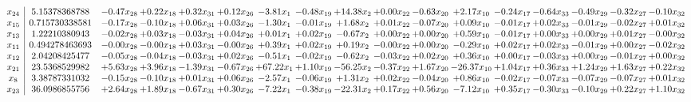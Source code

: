 \documentclass[9pt]{article}
\begin{document}
 \[\begin{array}{c| c c@{\hskip 2pt} c@{\hskip 2pt} c@{\hskip 2pt} c@{\hskip 2pt} c@{\hskip 2pt} c@{\hskip 2pt} c@{\hskip 2pt} c@{\hskip 2pt} c@{\hskip 2pt} c@{\hskip 2pt} c@{\hskip 2pt} c@{\hskip 2pt} c@{\hskip 2pt} c@{\hskip 2pt} c@{\hskip 2pt} }
 x_{24}   &  5.15378368788 & -0.47 x_{28} & +  0.22 x_{18} & +  0.32 x_{31} & +  0.12 x_{26} & -3.81 x_{1} & -0.48 x_{19} & + 14.38 x_{2} & +  0.00 x_{22} & -0.63 x_{20} & +  2.17 x_{10} & -0.24 x_{17} & -0.64 x_{33} & -0.49 x_{29} & -0.32 x_{27} & -0.10 x_{32}\\
 x_{15}   &  0.715730338581 & -0.17 x_{28} & -0.10 x_{18} & +  0.06 x_{31} & +  0.03 x_{26} & -1.30 x_{1} & -0.01 x_{19} & +  1.68 x_{2} & +  0.01 x_{22} & -0.07 x_{20} & +  0.09 x_{10} & -0.01 x_{17} & +  0.02 x_{33} & -0.01 x_{29} & -0.02 x_{27} & +  0.01 x_{32}\\
 x_{13}   &  1.22210380943 & -0.02 x_{28} & +  0.03 x_{18} & -0.03 x_{31} & +  0.04 x_{26} & +  0.01 x_{1} & +  0.02 x_{19} & -0.67 x_{2} & +  0.00 x_{22} & +  0.00 x_{20} & +  0.59 x_{10} & -0.01 x_{17} & +  0.00 x_{33} & +  0.00 x_{29} & +  0.01 x_{27} & -0.00 x_{32}\\
 x_{11}   &  0.494278463693 & -0.00 x_{28} & -0.00 x_{18} & +  0.03 x_{31} & -0.00 x_{26} & +  0.39 x_{1} & +  0.02 x_{19} & +  0.19 x_{2} & -0.00 x_{22} & +  0.00 x_{20} & -0.29 x_{10} & +  0.02 x_{17} & +  0.02 x_{33} & -0.01 x_{29} & +  0.00 x_{27} & -0.02 x_{32}\\
 x_{12}   &  2.04208425477 & -0.05 x_{28} & -0.04 x_{18} & -0.03 x_{31} & +  0.02 x_{26} & -0.51 x_{1} & -0.02 x_{19} & -0.62 x_{2} & -0.03 x_{22} & +  0.02 x_{20} & +  0.36 x_{10} & +  0.00 x_{17} & -0.03 x_{33} & +  0.00 x_{29} & -0.01 x_{27} & +  0.00 x_{32}\\
 x_{21}   &  23.5368529982 & +  5.63 x_{28} & +  3.96 x_{18} & -1.39 x_{31} & -0.67 x_{26} & + 67.22 x_{1} & +  1.10 x_{19} & -56.25 x_{2} & -0.37 x_{22} & +  1.67 x_{20} & -26.37 x_{10} & +  1.04 x_{17} & +  0.36 x_{33} & +  1.24 x_{29} & +  1.63 x_{27} & +  0.22 x_{32}\\
 x_{8}   &  3.38787331032 & -0.15 x_{28} & -0.10 x_{18} & +  0.01 x_{31} & +  0.06 x_{26} & -2.57 x_{1} & -0.06 x_{19} & +  1.31 x_{2} & +  0.02 x_{22} & -0.04 x_{20} & +  0.86 x_{10} & -0.02 x_{17} & -0.07 x_{33} & -0.07 x_{29} & -0.07 x_{27} & +  0.01 x_{32}\\
 x_{23}   &  36.0986855756 & +  2.64 x_{28} & +  1.89 x_{18} & -0.67 x_{31} & +  0.30 x_{26} & -7.22 x_{1} & -0.38 x_{19} & -22.31 x_{2} & +  0.17 x_{22} & +  0.56 x_{20} & -7.12 x_{10} & +  0.35 x_{17} & -0.30 x_{33} & -0.10 x_{29} & +  0.22 x_{27} & +  1.10 x_{32}\\

\end{array}\]
\end{document}
